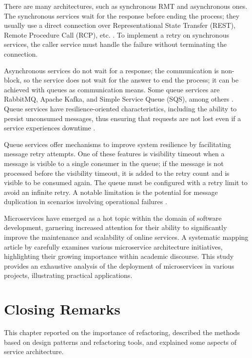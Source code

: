There are many architectures, such as synchronous RMT and asynchronous ones. The synchronous services wait for the response before ending the process; they usually use a direct connection over Representational State Transfer (REST), Remote Procedure Call (RCP), etc. \cite{microservices-comuni}. To implement a retry on synchronous services, the caller service must handle the failure without terminating the connection.

Asynchronous services do not wait for a response; the communication is non-block, so the service does not wait for the answer to end the process; it can be achieved with queues as communication means. Some queue services are RabbitMQ, Apache Kafka, and Simple Service Queue (SQS), among others \cite{KARABEYAKSAKALLI2021111014}. Queue services have resilience-oriented characteristics, including the ability to persist unconsumed messages, thus ensuring that requests are not lost even if a service experiences downtime \cite{Cebeci2020DesignOA}.

Queue services offer mechanisms to improve system resilience by facilitating message retry attempts. One of these features is visibility timeout when a message is visible to a single consumer in the queue; if the message is not processed before the visibility timeout, it is added to the retry count and is visible to be consumed again. The queue must be configured with a retry limit to avoid an infinite retry. A notable limitation is the potential for message duplication in scenarios involving operational failures \cite{ChenScalable}.

Microservices have emerged as a hot topic within the domain of software development, garnering increased attention for their ability to significantly improve the maintenance and scalability of online services. A systematic mapping article by \textcite{Alshuqayran} carefully examines various microservice architecture initiatives, highlighting their growing importance within academic discourse. This study provides an exhaustive analysis of the deployment of microservices in various projects, illustrating practical applications.

\section{Closing Remarks}
\label{sec2-remarks}
This chapter reported on the importance of refactoring, described the methods based on design patterns and refactoring tools, and explained some aspects of service architecture.

